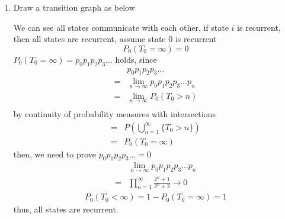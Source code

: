 \documentclass[12pt]{article}
\theoremstyle{remark}
\theoremstyle{definition}
\numberwithin{figure}{section}
\begin{document}
\vspace{.1in}


\begin{enumerate}[\textbf{3.}]
  \item 
Draw a transition graph as below
\begin{center}
\end{center}
We can see all states communicate with each other, if state $i$ is recurrent, then all states are recurrent, assume state $0$ is recurrent
\begin{equation*}
    P_0(T_{0} =\infty) = 0
\end{equation*}
$P_0(T_{0} =\infty) = p_0 p_1 p_2 p_3 ... $ holds, since
\begin{equation*}
\begin{align*}
       &p_0 p_1 p_2 p_3 ...\\
     = &\lim_{n\to\infty} p_0 p_1 p_2 p_3 ...p_n \\
     = &\lim_{n\to\infty}P_0(T_0 >n)\\
\end{align*}
\end{equation*}
 by continuity of probability measures with intersections\\
 \begin{equation*}
 \begin{align*}
     = &P(\bigcup\limits_{n=1}^{\infty } \big\{T_0 > n\big\})\\
     = &P_0(T_{0} =\infty)
\end{align*} 
 \end{equation*}   
then, we need to prove $p_0 p_1 p_2 p_3 ...=0$
\begin{equation*} 
\begin{align*}
       &\lim_{n\to\infty} p_0 p_1 p_2 p_3 ...p_n\\
     = & \prod_{n=1}^{\infty} \frac{2^n +1}{2^n +2}\to 0
\end{align*}
\end{equation*}
\begin{equation*} 
\begin{align*}
      P_0(T_{0} <\infty) = 1-P_0(T_{0} =\infty) = 1
\end{align*}
\end{equation*}
thus, all states are recurrent.
\end{enumerate}
\pagebreak
\end{document}
